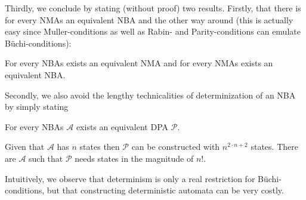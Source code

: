 Thirdly, we conclude by stating (without proof) two results. Firstly, that
there is for every \acp{NMA} an equivalent \ac{NBA} and the other way around
(this is actually easy since Muller-conditions as well as Rabin- and
Parity-conditions can emulate Büchi-conditions):
\begin{theorem}
  \cite[Theorem 1.10]{AutoLogInfGames}
  For every \acp{NBA} exists an equivalent \ac{NMA} and for every \acp{NMA}
  exists an equivalent \ac{NBA}.
\end{theorem}
Secondly, we also avoid the lengthy technicalities of determinization of an
\ac{NBA} by simply stating
\begin{theorem}
  \cite[Theorem 3.6]{AutoLogInfGames}
  \cite[Section 3.2]{NonDetBuechiToDetParity}
  \cite[Theorem 6]{OptBoundsAutoTrans}
  For every \acp{NBA} $\mathcal{A}$ exists an equivalent \ac{DPA}
  $\mathcal{P}$.

  Given that $\mathcal{A}$ has $n$ states then $\mathcal{P}$ can be
  constructed with $n^{2\cdot n + 2}$ states. There are $\mathcal{A}$
  such that $\mathcal{P}$ needs states in the magnitude of $n!$.
\end{theorem}
Intuitively, we observe that determinism is only a real restriction for
Büchi-conditions, but that constructing deterministic automata can be very
costly.


